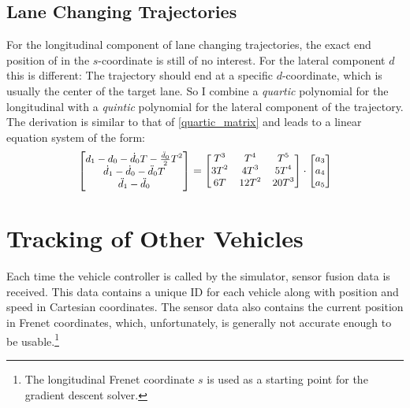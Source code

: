 \documentclass[twoside]{article}
\begin{document}
\subsection{Lane Changing Trajectories}
For the longitudinal component of lane changing trajectories, the exact end position of in
the $s$-coordinate is still of no interest. For the lateral component $d$ this is different:
The trajectory should end at a specific $d$-coordinate, which is usually the center of the
target lane. So I combine a \emph{quartic} polynomial for the longitudinal
with a \emph{quintic} polynomial for the lateral component of the trajectory. The derivation
is similar to that of \eqref{quartic_matrix} and leads to a linear equation system of the form:
\begin{equation}
\small
\begin{bmatrix}
d_1 - d_0 - \dot d_0 T - \frac{\ddot d_0}{2}  T^2\\
      \dot d_1 - \dot d_0 - \ddot d_0 T\\
      \ddot d_1 - \ddot d_0
\end{bmatrix}
=
\begin{bmatrix}
  T^3&    T^4&    T^5\\
3 T^2&  4 T^3&  5 T^4\\
 6 T& 12 T^2& 20 T^3
\end{bmatrix}
\cdot
\begin{bmatrix}
a_3 \\ a_4 \\ a_5
\end{bmatrix}
\end{equation}


\section{Tracking of Other Vehicles}
Each time the vehicle controller is called by the simulator, sensor fusion data is received.
This data contains a unique ID for each vehicle along with position and speed in Cartesian
coordinates. The sensor data also contains the current position in Frenet coordinates, which,
unfortunately, is generally not accurate enough to be usable.\hspace{-.08em}\footnote{
The longitudinal Frenet coordinate $s$ is used as a starting point for
the gradient descent solver.}
\end{document}
